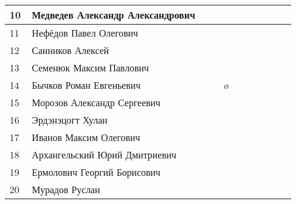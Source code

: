 \documentclass[a4paper,landscape,11pt]{article}
\newcommand*\ok{&{\small \ding{51}}} %
\newcommand*\no{&{\small }} %
\begin{document}
\begin{tabular}{p{7pt}|l|p{\CS}|p{\CS}|p{\CS}|p{\CS}|p{\CS}|p{\CS}|p{\CS}|p{\CS}|p{\CS}}
10\,&Медведев Александр Александрович      &\ok\ok\no\no&&&\\
\midrule
11\,&Нефёдов Павел Олегович                &\ok\no\no\no&&&\\
12\,&Санников Алексей                      &\ok\no\no\ok&&&\\
13\,&Семенюк Максим Павлович               &\no\no\ok\no&&&\\
14\,&Бычков Роман Евгеньевич               &\no\no\o\ok&&&&\\
15\,&Морозов Александр Сергеевич           &\no\no\no\no&&&\\
\midrule
16\,&Эрдэнэцогт Хулан                      &\no\ok\ok\no&&&\\
17\,&Иванов Максим Олегович                &\no\no\no\ok&&&\\
18\,&Архангельский Юрий Дмитриевич         &\no\no\ok\no&&&\\ 
19\,&Ермолович Георгий Борисович           &\no\no\no\no&&&\\
20\,& Мурадов Руслан                       &\no\no\no\no&&&\\
\bottomrule
\end{tabular} 
\end{document}
